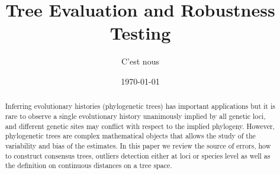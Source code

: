 \documentclass[a4paper,12pt]{article}
\title{Tree Evaluation and Robustness Testing}
\author{C'est nous}
\begin{document}

\date{\today}
\maketitle

\begin{abstract}
Inferring evolutionary histories (phylogenetic trees) has important applications but it is rare to observe a single evolutionary history unanimously implied by all genetic loci, and different genetic sites may conflict with respect to the implied phylogeny.  However, phylogenetic trees are complex mathematical objects that allows the study of the variability and bias of the estimates. In this paper we review the source of errors, how to construct consensus trees, outliers detection either at loci or species level as well as the definition on continuous distances on a tree space.
\end{abstract}

\tableofcontents







% 





\end{document}
